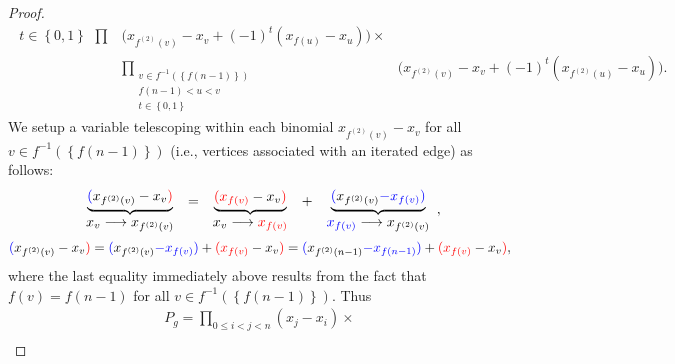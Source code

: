 \begin{proof}
\begin{equation}
\begin{array}{ccc}
{\begin{array}{c}
t\in\left\{ 0,1\right\} 
\end{array}}{\prod} & \bigg(x_{f^{\left(2\right)}\left(v\right)}-x_{v}+\left(-1\right)^{t}(x_{f\left(u\right)}-x_{u})\bigg)\times\\
 & \underset{\begin{array}{c}
v\in f^{-1}\left(\left\{ f\left(n-1\right)\right\} \right)\\
f\left(n-1\right)<u<v\\
t\in\left\{ 0,1\right\} 
\end{array}}{\prod} & \bigg(x_{f^{\left(2\right)}\left(v\right)}-x_{v}+\left(-1\right)^{t}(x_{f^{\left(2\right)}\left(u\right)}-x_{u})\bigg).
\end{array}
\end{equation}
We setup a variable {telescoping} within each binomial $x_{f^{\left(2\right)}\left(v\right)}-x_{v}$
for all $v\in f^{-1}\left(\left\{ f\left(n-1\right)\right\} \right)$
(i.e., vertices associated with an iterated edge) as follows:
\[
\begin{array}{c}
\underbrace{{\color{blue}(}x_{f^{\left(2\right)}\left(v\right)}-x_{v}{\color{red})}}\\
x_{v}\longrightarrow x_{f^{\left(2\right)}\left(v\right)}
\end{array}\begin{array}{c}
=\\
\\
\end{array}\begin{array}{c}
\underbrace{{\color{red}(x_{f\left(v\right)}}-x_{v}{\color{red})}}\\
x_{v}\longrightarrow{\color{red}x_{f\left(v\right)}}
\end{array}\begin{array}{c}
+\\
\\
\end{array}\begin{array}{c}
\underbrace{{\color{blue}(}x_{f^{\left(2\right)}\left(v\right)}{\color{blue}-x_{f\left(v\right)}}{\color{blue})}}\\
{\color{blue}x_{f\left(v\right)}}\longrightarrow x_{f^{\left(2\right)}\left(v\right)}
\end{array},
\]
\[
{\color{blue}(}x_{f^{\left(2\right)}\left(v\right)}-x_{v}{\color{red})}={\color{blue}(}x_{f^{\left(2\right)}\left(v\right)}{\color{blue}-x_{f\left(v\right)}}{\color{blue})}+{\color{red}(x_{f\left(v\right)}}-x_{v}{\color{red})}={\color{blue}(}x_{f^{\left(2\right)}\left(n-1\right)}{\color{blue}-x_{f\left(n-1\right)}}{\color{blue})}+{\color{red}(x_{f\left(v\right)}}-x_{v}{\color{red})},
\]
where the last equality immediately above results from the fact that $f\left(v\right)=f\left(n-1\right)$
for all $v\in f^{-1}\left(\left\{ f(n-1)\right\} \right)$. Thus
\[
\begin{array}{c}
P_{g} = \underset{0 \le i < j < n}{\prod} \left(x_{j} - x_{i}\right) \times \\[10pt]


\end{array}\]
\end{proof}

